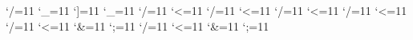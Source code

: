 {%
	\catcode`/=11\relax
	\catcode`\_=11\relax
	\catcode`]=11\relax
	\gdef\/r_ele>{%
		\LD@XML@Read
		\LD@XML@/R_ELE
	}%
	\gdef\LD@XML@/R_ELE{%
		\if N\LD@Entry@Opt
			\xdef\LD@Entry@REle{\LD@Entry@REle \LD@Entry@Reb}%
		\else
			\xdef\LD@Entry@REle{\LD@Entry@REle ]\LD@Entry@Reb}%
		\fi
		\LD@XML@Parse
	}%
}%
{%
	\catcode`\_=11\relax
	\gdef\sense>{%
		\LD@XML@Read
		\LD@XML@SENSE
	}%
	\gdef\LD@XML@SENSE{%
		\xdef\LD@Entry@Sense@Buffer{}%
		\xdef\LD@Entry@Gloss{}%
		\LD@XML@Parse
	}%
}%
{%
	\catcode`/=11\relax
	\catcode`<=11\relax
	\gdef\stagk>{%
		\LD@XML@Read
		\LD@XML@STAGK
	}%
	\gdef\LD@XML@STAGK #1</stagk>{%
		\ifx\LD@Entry@Sense@Buffer\LD@Empty 
			\xdef\LD@Entry@Sense@Buffer{Stagk=#1}%
		\else
			\xdef\LD@Entry@Sense@Buffer{\LD@Entry@Sense@Buffer ,Stagk=#1}%
		\fi
		\LD@XML@Parse
	}%
}%
{%
	\catcode`/=11\relax
	\catcode`<=11\relax
	\gdef\stagr>{%
		\LD@XML@Read
		\LD@XML@STAGR
	}%
	\gdef\LD@XML@STAGR #1</stagr>{%
		\ifx\LD@Entry@Sense@Buffer\LD@Empty 
			\xdef\LD@Entry@Sense@Buffer{Stagr=#1}%
		\else
			\xdef\LD@Entry@Sense@Buffer{\LD@Entry@Sense@Buffer ,Stagr=#1}%
		\fi
		\LD@XML@Parse
	}%
}%
{%
	\catcode`/=11\relax
	\catcode`<=11\relax
	\gdef\xref>{%
		\LD@XML@Read
		\LD@XML@XREF
	}%
	\gdef\LD@XML@XREF #1</xref>{%
		\LD@XML@Parse
	}%
}%
{%
	\catcode`/=11\relax
	\catcode`<=11\relax
	\gdef\ant>{%
		\LD@XML@Read
		\LD@XML@ANT
	}%
	\gdef\LD@XML@ANT #1</ant>{%
		\LD@XML@Parse
	}%
}%
{%
	\catcode`/=11\relax
	\catcode`<=11\relax
	\catcode`&=11\relax
	\catcode`;=11\relax
	\gdef\pos>{%
		\LD@XML@Read
		\LD@XML@POS
	}%
	\gdef\LD@XML@POS &#1;</pos>{%
		\ifx\LD@Entry@Sense@Buffer\LD@Empty 
			\xdef\LD@Entry@Sense@Buffer{Pos=\CS LD@Entity@#1\EC}%
		\else
			\xdef\LD@Entry@Sense@Buffer{\LD@Entry@Sense@Buffer ,Pos=\CS LD@Entity@#1\EC}%
		\fi
		\LD@XML@Parse
	}%
}%
{%
	\catcode`/=11\relax
	\catcode`<=11\relax
	\catcode`&=11\relax
	\catcode`;=11\relax
	\gdef\field>{%
		\LD@XML@Read
		\LD@XML@Field
	}%
	\gdef\LD@XML@Field &#1;</field>{%
		\ifx\LD@Entry@Sense@Buffer\LD@Empty 
			\xdef\LD@Entry@Sense@Buffer{Field=\CS LD@Entity@#1\EC}%
		\else
			\xdef\LD@Entry@Sense@Buffer{\LD@Entry@Sense@Buffer ,Field=\CS LD@Entity@#1\EC}%
		\fi
		\LD@XML@Parse
	}%
}%
